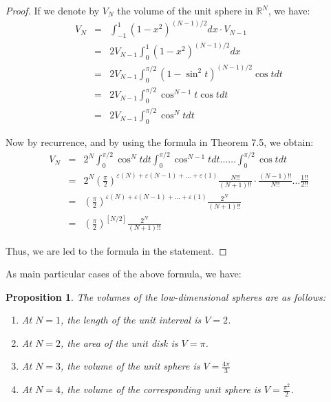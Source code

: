 \documentclass[12pt]{amsbook}
\newtheorem{proposition}[theorem]{Proposition}
\begin{document}
\begin{proof}
If we denote by $V_N$ the volume of the unit sphere in $\mathbb R^N$, we have:
\begin{eqnarray*}
V_N
&=&\int_{-1}^1(1-x^2)^{(N-1)/2}dx\cdot V_{N-1}\\
&=&2V_{N-1}\int_0^1(1-x^2)^{(N-1)/2}dx\\
&=&2V_{N-1}\int_0^{\pi/2}(1-\sin^2 t)^{(N-1)/2}\cos tdt\\
&=&2V_{N-1}\int_0^{\pi/2}\cos^{N-1}t\cos tdt\\
&=&2V_{N-1}\int_0^{\pi/2}\cos^Ntdt
\end{eqnarray*}

Now by recurrence, and by using the formula in Theorem 7.5, we obtain:
\begin{eqnarray*}
V_N
&=&2^N\int_0^{\pi/2}\cos^Ntdt\int_0^{\pi/2}\cos^{N-1}tdt\ldots\ldots\int_0^{\pi/2}\cos tdt\\
&=&2^N\left(\frac{\pi}{2}\right)^{\varepsilon(N)+\varepsilon(N-1)+\ldots+\varepsilon(1)}\frac{N!!}{(N+1)!!}\cdot\frac{(N-1)!!}{N!!}\ldots\frac{1!!}{2!!}\\
&=&\left(\frac{\pi}{2}\right)^{\varepsilon(N)+\varepsilon(N-1)+\ldots+\varepsilon(1)}\frac{2^N}{(N+1)!!}\\
&=&\left(\frac{\pi}{2}\right)^{[N/2]}\frac{2^N}{(N+1)!!}
\end{eqnarray*}

Thus, we are led to the formula in the statement.
\end{proof}

As main particular cases of the above formula, we have:


\begin{proposition}
The volumes of the low-dimensional spheres are as follows:
\begin{enumerate}
\item At $N=1$, the length of the unit interval is $V=2$.

\item At $N=2$, the area of the unit disk is $V=\pi$.

\item At $N=3$, the volume of the unit sphere is $V=\frac{4\pi}{3}$

\item At $N=4$, the volume of the corresponding unit sphere is $V=\frac{\pi^2}{2}$.
\end{enumerate}
\end{proposition}
\end{document}
